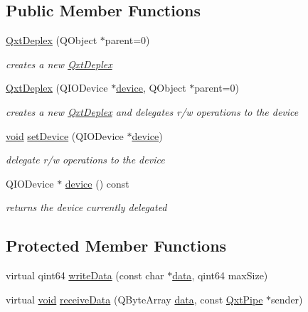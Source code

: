\subsection*{Public Member Functions}
\begin{DoxyCompactItemize}
\item 
\hyperlink{class_qxt_deplex_abe42e0af4ae8a1fb28a3dd0c18e45c12}{Qxt\-Deplex} (Q\-Object $\ast$parent=0)
\begin{DoxyCompactList}\small\item\em creates a new \hyperlink{class_qxt_deplex}{Qxt\-Deplex} \end{DoxyCompactList}\item 
\hyperlink{class_qxt_deplex_ac094da6c83bc6c8eeac7f055fdd85f30}{Qxt\-Deplex} (Q\-I\-O\-Device $\ast$\hyperlink{class_qxt_deplex_ab8d05200c926de13f2a69abee19217a6}{device}, Q\-Object $\ast$parent=0)
\begin{DoxyCompactList}\small\item\em creates a new \hyperlink{class_qxt_deplex}{Qxt\-Deplex} and delegates r/w operations to the device \end{DoxyCompactList}\item 
\hyperlink{group___u_a_v_objects_plugin_ga444cf2ff3f0ecbe028adce838d373f5c}{void} \hyperlink{class_qxt_deplex_a179252f9e59c44ffeb211df015b48c8b}{set\-Device} (Q\-I\-O\-Device $\ast$\hyperlink{class_qxt_deplex_ab8d05200c926de13f2a69abee19217a6}{device})
\begin{DoxyCompactList}\small\item\em delegate r/w operations to the device \end{DoxyCompactList}\item 
Q\-I\-O\-Device $\ast$ \hyperlink{class_qxt_deplex_ab8d05200c926de13f2a69abee19217a6}{device} () const 
\begin{DoxyCompactList}\small\item\em returns the device currently delegated \end{DoxyCompactList}\end{DoxyCompactItemize}
\subsection*{Protected Member Functions}
\begin{DoxyCompactItemize}
\item 
virtual qint64 \hyperlink{class_qxt_deplex_a9d5bdbaab0b92fca1dbc3280ee5a9f4a}{write\-Data} (const char $\ast$\hyperlink{glext_8h_a8850df0785e6fbcc2351af3b686b8c7a}{data}, qint64 max\-Size)
\item 
virtual \hyperlink{group___u_a_v_objects_plugin_ga444cf2ff3f0ecbe028adce838d373f5c}{void} \hyperlink{class_qxt_deplex_aa339f465121eeca086dd55a60a0acf96}{receive\-Data} (Q\-Byte\-Array \hyperlink{glext_8h_a8850df0785e6fbcc2351af3b686b8c7a}{data}, const \hyperlink{class_qxt_pipe}{Qxt\-Pipe} $\ast$sender)
\end{DoxyCompactItemize}


